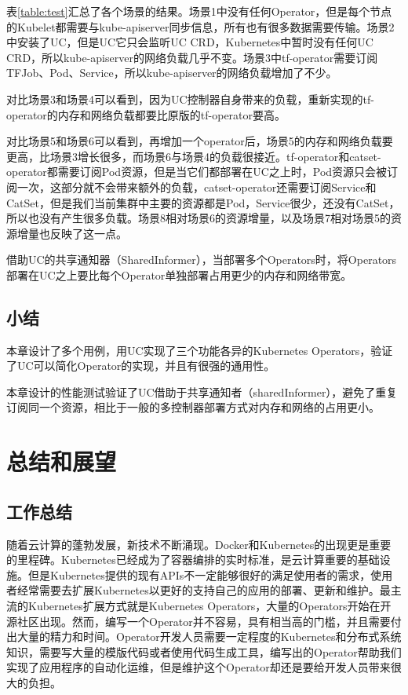 \documentclass[macfonts,master]{njuthesis}
\begin{document}
表\ref{table:test}汇总了各个场景的结果。场景1中没有任何Operator，但是每个节点的Kubelet都需要与kube-apiserver同步信息，所有也有很多数据需要传输。场景2中安装了UC，但是UC它只会监听UC CRD，Kubernetes中暂时没有任何UC CRD，所以kube-apiserver的网络负载几乎不变。场景3中tf-operator需要订阅TFJob、Pod、Service，所以kube-apiserver的网络负载增加了不少。

对比场景3和场景4可以看到，因为UC控制器自身带来的负载，重新实现的tf-operator的内存和网络负载都要比原版的tf-operator要高。

对比场景5和场景6可以看到，再增加一个operator后，场景5的内存和网络负载要更高，比场景3增长很多，而场景6与场景4的负载很接近。tf-operator和catset-operator都需要订阅Pod资源，但是当它们都部署在UC之上时，Pod资源只会被订阅一次，这部分就不会带来额外的负载，catset-operator还需要订阅Service和CatSet，但是我们当前集群中主要的资源都是Pod，Service很少，还没有CatSet，所以也没有产生很多负载。场景8相对场景6的资源增量，以及场景7相对场景5的资源增量也反映了这一点。

借助UC的共享通知器（SharedInformer），当部署多个Operators时，将Operators部署在UC之上要比每个Operator单独部署占用更少的内存和网络带宽。

\section{小结}
本章设计了多个用例，用UC实现了三个功能各异的Kubernetes Operators，验证了UC可以简化Operator的实现，并且有很强的通用性。

本章设计的性能测试验证了UC借助于共享通知者（sharedInformer），避免了重复订阅同一个资源，相比于一般的多控制器部署方式对内存和网络的占用更小。
\chapter{总结和展望}\label{chapter_concludes}
\section{工作总结}
随着云计算的蓬勃发展，新技术不断涌现。Docker和Kubernetes的出现更是重要的里程碑。Kubernetes已经成为了容器编排的实时标准，是云计算重要的基础设施。但是Kubernetes提供的现有APIs不一定能够很好的满足使用者的需求，使用者经常需要去扩展Kubernetes以更好的支持自己的应用的部署、更新和维护。最主流的Kubernetes扩展方式就是Kubernetes Operators，大量的Operators开始在开源社区出现。然而，编写一个Operator并不容易，具有相当高的门槛，并且需要付出大量的精力和时间。Operator开发人员需要一定程度的Kubernetes和分布式系统知识，需要写大量的模版代码或者使用代码生成工具，编写出的Operator帮助我们实现了应用程序的自动化运维，但是维护这个Operator却还是要给开发人员带来很大的负担。
\end{document}
